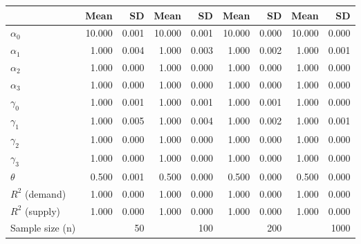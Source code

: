 
\begin{tabular}[t]{lrrrrrrrr}
\toprule
  & Mean & SD & Mean  & SD  & Mean   & SD   & Mean    & SD   \\
\midrule
$\alpha_{0}$ & 10.000 & 0.001 & 10.000 & 0.001 & 10.000 & 0.000 & 10.000 & 0.000\\
$\alpha_{1}$ & 1.000 & 0.004 & 1.000 & 0.003 & 1.000 & 0.002 & 1.000 & 0.001\\
$\alpha_{2}$ & 1.000 & 0.000 & 1.000 & 0.000 & 1.000 & 0.000 & 1.000 & 0.000\\
$\alpha_{3}$ & 1.000 & 0.000 & 1.000 & 0.000 & 1.000 & 0.000 & 1.000 & 0.000\\
$\gamma_{0}$ & 1.000 & 0.001 & 1.000 & 0.001 & 1.000 & 0.001 & 1.000 & 0.000\\
$\gamma_{1}$ & 1.000 & 0.005 & 1.000 & 0.004 & 1.000 & 0.002 & 1.000 & 0.001\\
$\gamma_{2}$ & 1.000 & 0.000 & 1.000 & 0.000 & 1.000 & 0.000 & 1.000 & 0.000\\
$\gamma_{3}$ & 1.000 & 0.000 & 1.000 & 0.000 & 1.000 & 0.000 & 1.000 & 0.000\\
$\theta$ & 0.500 & 0.001 & 0.500 & 0.000 & 0.500 & 0.000 & 0.500 & 0.000\\
$R^{2}$ (demand) & 1.000 & 0.000 & 1.000 & 0.000 & 1.000 & 0.000 & 1.000 & 0.000\\
$R^{2}$ (supply) & 1.000 & 0.000 & 1.000 & 0.000 & 1.000 & 0.000 & 1.000 & 0.000\\
Sample size (n) &  & 50 &  & 100 &  & 200 &  & 1000\\
\bottomrule
\end{tabular}

